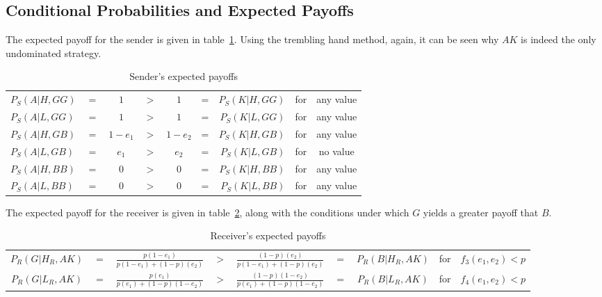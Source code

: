 \documentclass[a4paper,12pt]{article}
\numberwithin{equation}{section}
\begin{document}
\subsection{Conditional Probabilities and Expected Payoffs}
\label{sec:Cue Game with Unobservable Amplification/Conditional Payoffs}

The expected payoff for the sender is given in table~\ref{tab:CueGamewithUnobservableAmplification/ConditionalPayoffsS}. Using the trembling hand method, again, it can be seen why $AK$ is indeed the only undominated strategy.

\begin{table}[h]
\begin{center}
\begin{tabular}{lcccccrcc}
$P_{S}(A|H,GG)$ & $=$ & $1$ & $>$ & $1$ & = & $P_{S}(K|H,GG)$ & for & any value\\
$P_{S}(A|L,GG)$ & $=$ & $1$ & $>$ & $1$ & = & $P_{S}(K|L,GG)$ & for & any value\\
$P_{S}(A|H,GB)$ & $=$ & $1-e_{1}$ & $>$ & $1-e_{2}$ & = & $P_{S}(K|H,GB)$ & for & any value\\
$P_{S}(A|L,GB)$ & $=$ & $e_{1}$ & $>$ & $e_{2}$ & = & $P_{S}(K|L,GB)$ & for & no value\\
$P_{S}(A|H,BB)$ & $=$ & $0$ & $>$ & $0$ & = & $P_{S}(K|H,BB)$ & for & any value\\
$P_{S}(A|L,BB)$ & $=$ & $0$ & $>$ & $0$ & = & $P_{S}(K|L,BB)$ & for & any value
\end{tabular}
\end{center}
\caption{Sender's expected payoffs}
\label{tab:CueGamewithUnobservableAmplification/ConditionalPayoffsS}
\end{table}

The expected payoff for the receiver is given in table~\ref{tab:CueGamewithUnobservableAmplification/ConditionalPayoffsR}, along with the conditions under which $G$ yields a greater payoff that $B$.

\begin{table}[!h]
\setlength{\tabcolsep}{.18em}
\begin{center}
\begin{tabular}{ccccccccc}
$P_{R}(G|H_{R},AK)$ & $=$ & $\frac{p(1-e_{1})}{p(1-e_{1})+(1-p)(e_{2})}$ & $>$ & $\frac{(1-p)(e_{2})}{p(1-e_{1})+(1-p)(e_{2})}$ & $=$ & $P_{R}(B|H_{R},AK)$ & for & $f_{3}(e_{1},e_{2})<p$\\
$P_{R}(G|L_{R},AK)$ & $=$ & $\frac{p(e_{1})}{p(e_{1})+(1-p)(1-e_{2})}$ & $>$ & $\frac{(1-p)(1-e_{2})}{p(e_{1})+(1-p)(1-e_{2})}$ & $=$ & $P_{R}(B|L_{R},AK)$ & for & $f_{4}(e_{1},e_{2})<p$
\end{tabular}
\end{center}
\caption{Receiver's expected payoffs}
\label{tab:CueGamewithUnobservableAmplification/ConditionalPayoffsR}
\end{table}
\end{document}
